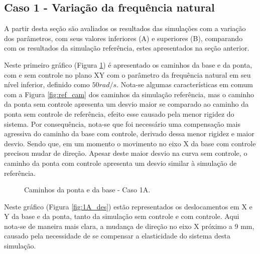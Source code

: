 
\subsection{Caso 1 - Variação da frequência natural}
A partir desta seção são avaliados os resultados das simulações com a variação dos parâmetros, com seus valores inferiores (A) e superiores (B), comparando com os resultados da simulação referência, estes apresentados na seção anterior.


Neste primeiro gráfico (Figura \ref{fig:1A_cam}) é apresentado os caminhos da base e da ponta, com e sem controle no plano XY com o parâmetro da frequência natural em seu nível inferior, definido como \(50 rad/s\). Nota-se algumas características em comum com a Figura \ref{fig:ref_cam} dos caminhos da simulação referência, mas o caminho da ponta sem controle apresenta um desvio maior se comparado ao caminho da ponta sem controle de referência, efeito esse causado pela menor rigidez do sistema. Por consequência, nota-se que foi necessário uma compensação mais agressiva do caminho da base com controle, derivado dessa menor rigidez e maior desvio. Sendo que, em um momento o movimento no eixo X da base com controle precisou mudar de direção. Apesar deste maior desvio na curva sem controle, o caminho da ponta com controle apresenta um desvio similar à simulação de referência.

\begin{figure}[H]
    \centering
    \hfill
    \hfill
    \hfill
    \caption{Caminhos da ponta e da base - Caso 1A.}
    \label{fig:1A_cam}
\end{figure}

Neste gráfico (Figura \ref{fig:1A_des}) estão representados os deslocamentos em X e Y da base e da ponta, tanto da simulação sem controle e com controle. Aqui nota-se de maneira mais clara, a mudança de direção no eixo X próximo a 9 mm, causado pela necessidade de se compensar a elasticidade do sistema desta simulação.

